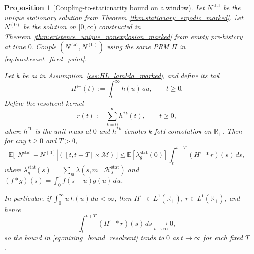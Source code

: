 \documentclass[12pt]{article}
\newtheorem{proposition}[theorem]{Proposition}
\begin{document}
\begin{proposition}[Coupling-to-stationarity bound on a window]
\label{prop:mixing_bound_marked}
Let $N^{\mathrm{stat}}$ be the unique stationary solution from Theorem~\ref{thm:stationary_ergodic_marked}.
Let $N^{(0)}$ be the solution on $[0,\infty)$ constructed in Theorem~\ref{thm:existence_unique_nonexplosion_marked} from \emph{empty} pre-history at time $0$.
Couple $(N^{\mathrm{stat}},N^{(0)})$ using the \emph{same} PRM $\Pi$ in \eqref{eq:hawkesnet_fixed_point}.

Let $h$ be as in Assumption~\ref{ass:HL_lambda_marked}, and define its tail
\[
H^\leftarrow(t):=\int_t^\infty h(u)\,du,\qquad t\ge 0.
\]
Define the \emph{resolvent} kernel
\[
r(t):=\sum_{k=0}^\infty h^{*k}(t),\qquad t\ge 0,
\]
where $h^{*0}$ is the unit mass at $0$ and $h^{*k}$ denotes $k$-fold convolution on $\mathbb R_+$.
Then for any $t\ge 0$ and $T>0$,
\begin{equation}
\label{eq:mixing_bound_resolvent}
\mathbb E\bigl[\,|N^{\mathrm{stat}}-N^{(0)}|([t,t+T]\times\mathcal M)\,\bigr]
\le
\mathbb E[\lambda^{\mathrm{stat}}_g(0)]
\int_t^{t+T} (H^\leftarrow * r)(s)\,ds,
\end{equation}
where $\lambda^{\mathrm{stat}}_g(s):=\sum_m \lambda(s,m\mid \mathcal H^{\mathrm{stat}}_s)$ and $(f*g)(s)=\int_0^s f(s-u)g(u)\,du$.

In particular, if $\int_0^\infty u\,h(u)\,du<\infty$, then $H^\leftarrow\in L^1(\mathbb R_+)$, $r\in L^1(\mathbb R_+)$, and hence
\[
\int_t^{t+T} (H^\leftarrow * r)(s)\,ds \xrightarrow[t\to\infty]{} 0,
\]
so the bound in \eqref{eq:mixing_bound_resolvent} tends to $0$ as $t\to\infty$ for each fixed $T$.
\end{proposition}
\end{document}
